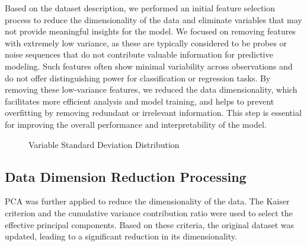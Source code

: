 \documentclass[
  12pt,
  letterpaper,
  DIV=11,
  numbers=noendperiod]{scrartcl}
\begin{document}
Based on the dataset description, we performed an initial feature
selection process to reduce the dimensionality of the data and eliminate
variables that may not provide meaningful insights for the model. We
focused on removing features with extremely low variance, as these are
typically considered to be probes or noise sequences that do not
contribute valuable information for predictive modeling. Such features
often show minimal variability across observations and do not offer
distinguishing power for classification or regression tasks. By removing
these low-variance features, we reduced the data dimensionality, which
facilitates more efficient analysis and model training, and helps to
prevent overfitting by removing redundant or irrelevant information.
This step is essential for improving the overall performance and
interpretability of the model.

\begin{figure}


\caption{\label{fig-init1}Variable Standard Deviation Distribution}

\end{figure}%

\subsection{Data Dimension Reduction
Processing}\label{data-dimension-reduction-processing}

PCA was further applied to reduce the dimensionality of the data. The
Kaiser criterion and the cumulative variance contribution ratio were
used to select the effective principal components. Based on these
criteria, the original dataset was updated, leading to a significant
reduction in its dimensionality.
\end{document}
